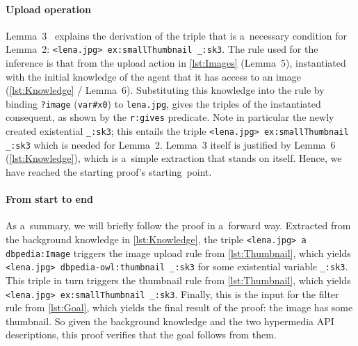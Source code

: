 \paragraph{\bfseries Upload operation}
Lemma~3~ explains the derivation of the triple
that is a~necessary condition for Lemma~2:
\verb!<lena.jpg> ex:smallThumbnail _:sk3!.
The rule used for the inference is that
from the upload action in \cref{lst:Images} (Lemma~5),
instantiated with the initial knowledge of the agent
that it has access to an image (\cref{lst:Knowledge} / Lemma~6).
Substituting this knowledge into the rule
by binding \verb!?image! (\verb!var#x0!)
 to \verb!lena.jpg!,
gives the triples of the instantiated consequent,
as shown by the \verb!r:gives! predicate.
Note in particular the newly created existential \verb!_:sk3!;
this entails the triple \verb!<lena.jpg> ex:smallThumbnail _:sk3!
which is needed for Lemma~2.
Lemma~3 itself is justified by Lemma~6 (\cref{lst:Knowledge}),
which is a~simple extraction that stands on itself.
Hence, we have reached the starting proof's starting~point.

\vspace{-1em}

\paragraph{\bfseries From start to end}
As a~summary, we will briefly follow the proof in a~forward way.
Extracted from the background knowledge in \cref{lst:Knowledge},
the triple \verb!<lena.jpg> a dbpedia:Image!
triggers the image upload rule from \cref{lst:Thumbnail},
which yields \verb!<lena.jpg> dbpedia-owl:thumbnail _:sk3!
for some existential variable \verb!_:sk3!.
This triple in turn triggers the thumbnail rule from \cref{lst:Thumbnail},
which yields \verb!<lena.jpg> ex:smallThumbnail _:sk3!.
Finally, this is the input for the filter rule from \cref{lst:Goal},
which yields the final result of the proof:
the image has some thumbnail.
So given the background knowledge
and the two hypermedia API descriptions,
this proof verifies that the goal follows from them.

